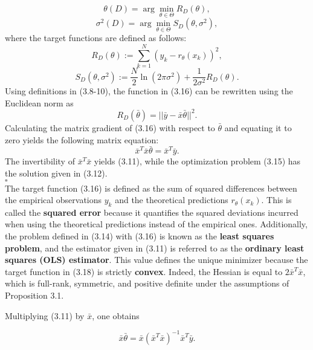 \documentclass{report}
\begin{document}
\begin{equation}
 \theta(D) = \arg\min_{\theta \in \Theta} R_{D}(\theta),
\end{equation}
\begin{equation}
 \sigma^2(D) = \arg\min_{\theta \in \Theta} S_{D}(\theta, \sigma^2),
\end{equation}
where the target functions are defined as follows:
\begin{equation}
R_{D}(\theta) := \sum_{k=1}^N(y_k-r_\theta(x_k))^2,
\end{equation}
\begin{equation}
S_{D}(\theta,\sigma^2) := \frac{N}{2}\ln(2\pi\sigma^2)+\frac{1}{2\sigma^2}R_{D}(\theta).
\end{equation}
Using definitions in (3.8-10), the function in (3.16) can be rewritten using the Euclidean norm as
\begin{equation}
R_{D}(\bar{\theta}) = ||\bar{y} -\bar{x}\bar{\theta}||^2.
\end{equation}
Calculating the matrix gradient of (3.16) with respect to $\bar{\theta}$ and equating it to zero yields the following matrix equation:
\begin{equation}
\bar{x}^T\bar{x}\bar{\theta} = \bar{x}^T\bar{y}.
\end{equation}
The invertibility of $\bar{x}^T\bar{x}$ yields (3.11), while the optimization problem (3.15) has the solution given in (3.12).\\
$\square$\\

The target function (3.16) is defined as the sum of squared differences between the empirical observations $y_k$ and the theoretical predictions $r_\theta(x_k)$. This is called the \textbf{squared error} because it quantifies the squared deviations incurred when using the theoretical predictions instead of the empirical ones. Additionally, the problem defined in (3.14) with (3.16) is known as the \textbf{least squares problem}, and the estimator given in (3.11) is referred to as the \textbf{ordinary least squares (OLS) estimator}. This value defines the unique minimizer because the target function in (3.18) is strictly \textbf{convex}. Indeed, the Hessian is equal to $2\bar{x}^T\bar{x}$, which is full-rank, symmetric, and positive definite under the assumptions of Proposition 3.1.

Multiplying (3.11) by $\bar{x}$, one obtains

\begin{equation}
\bar{x}\bar{\theta} = \bar{x}(\bar{x}^T\bar{x})^{-1}\bar{x}^T\bar{y}.
\end{equation}
\end{document}
